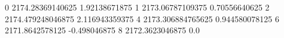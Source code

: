 0 2174.28369140625 1.92138671875
1 2173.06787109375 0.70556640625
2 2174.479248046875 2.116943359375
4 2173.306884765625 0.944580078125
6 2171.8642578125 -0.498046875
8 2172.3623046875 0.0
